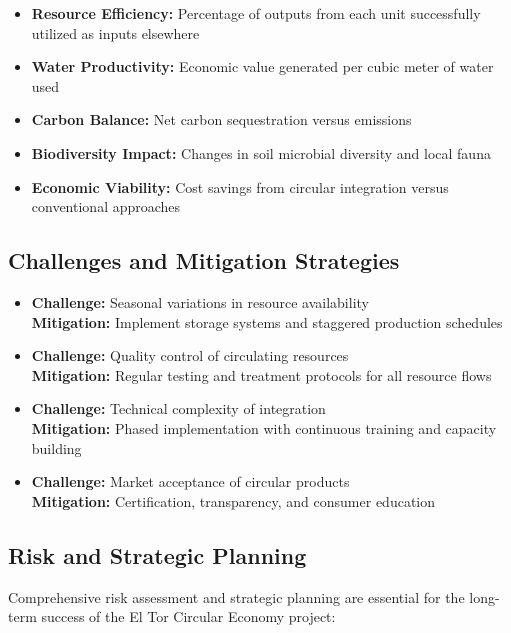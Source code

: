 \begin{itemize}
    \item \textbf{Resource Efficiency:} Percentage of outputs from each unit successfully utilized as inputs elsewhere
    \item \textbf{Water Productivity:} Economic value generated per cubic meter of water used
    \item \textbf{Carbon Balance:} Net carbon sequestration versus emissions
    \item \textbf{Biodiversity Impact:} Changes in soil microbial diversity and local fauna
    \item \textbf{Economic Viability:} Cost savings from circular integration versus conventional approaches
\end{itemize}

\subsection{Challenges and Mitigation Strategies}

\begin{itemize}
    \item \textbf{Challenge:} Seasonal variations in resource availability\\
    \textbf{Mitigation:} Implement storage systems and staggered production schedules
    
    \item \textbf{Challenge:} Quality control of circulating resources\\
    \textbf{Mitigation:} Regular testing and treatment protocols for all resource flows
    
    \item \textbf{Challenge:} Technical complexity of integration\\
    \textbf{Mitigation:} Phased implementation with continuous training and capacity building
    
    \item \textbf{Challenge:} Market acceptance of circular products\\
    \textbf{Mitigation:} Certification, transparency, and consumer education
\end{itemize}

\subsection{Risk and Strategic Planning}

Comprehensive risk assessment and strategic planning are essential for the long-term success of the El Tor Circular Economy project:

